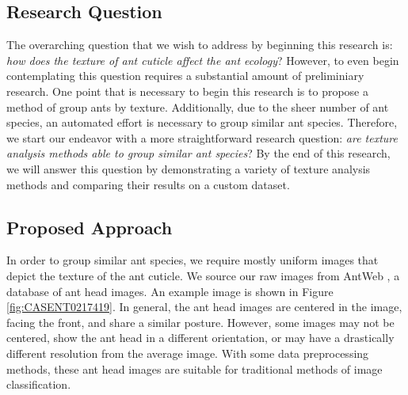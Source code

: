 \documentclass[12pt]{article}
\begin{document}
\subsection{Research Question}

The overarching question that we wish to address by beginning this research is:
\textit{how does the texture of ant cuticle affect the ant ecology}? However, to
even begin contemplating this question requires a substantial amount of
preliminiary research. One point that is necessary to begin this research is to
propose a method of group ants by texture. Additionally, due to the sheer number
of ant species, an automated effort is necessary to group similar ant species.
Therefore, we start our endeavor with a more straightforward research question:
\textit{are texture analysis methods able to group similar ant species}? By the
end of this research, we will answer this question by demonstrating a variety of
texture analysis methods and comparing their results on a custom dataset.

\subsection{Proposed Approach}

In order to group similar ant species, we require mostly uniform images that
depict the texture of the ant cuticle. We source our raw images from AntWeb
\cite{perrichot_antweb_2012}, a database of ant head images. An example image is
shown in Figure \ref{fig:CASENT0217419}. In general, the ant head images are centered in
the image, facing the front, and share a similar posture. However, some images
may not be centered, show the ant head in a different orientation, or may have a
drastically different resolution from the average image. With some data
preprocessing methods, these ant head images are suitable for traditional
methods of image classification.
\end{document}
